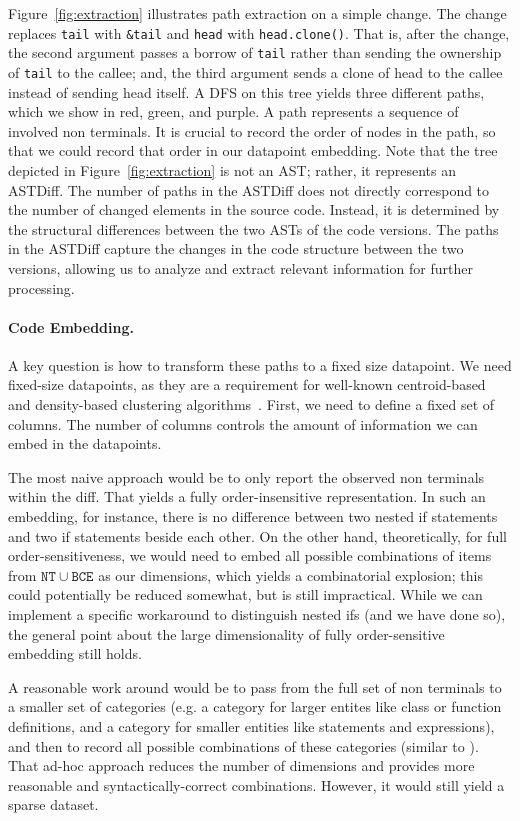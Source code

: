 Figure~\ref{fig:extraction} illustrates path extraction on a simple change. The change replaces \verb+tail+ with \verb+&tail+ and \verb+head+ with \verb+head.clone()+. That is, after the change, the second argument passes a borrow of \verb+tail+ rather than sending the ownership of \verb+tail+ to the callee; and, the third argument sends a clone of head to the callee instead of sending head itself. A DFS on this tree yields three different paths, which we show in red, green, and purple. A path represents a sequence of involved non terminals. It is crucial to record the order of nodes in the path, so that we could record that order in our datapoint embedding. Note that the tree depicted in Figure~\ref{fig:extraction} is not an AST; rather, it represents an ASTDiff. The number of paths in the ASTDiff does not directly correspond to the number of changed elements in the source code. Instead, it is determined by the structural differences between the two ASTs of the code versions. The paths in the ASTDiff capture the changes in the code structure between the two versions, allowing us to analyze and extract relevant information for further processing.


\paragraph{Code Embedding.} A key question is how to transform these paths to a fixed size datapoint. We need fixed-size datapoints, as they are a requirement for well-known centroid-based and density-based clustering algorithms~\citep{xu2005survey}. First, we need to define a fixed set of columns. The number of columns controls the amount of information we can embed in the datapoints. 

The most naive approach would be to only report the observed non terminals within the diff. That yields a fully order-insensitive representation. In such an embedding, for instance, there is no difference between two nested if statements and two if statements beside each other. On the other hand, theoretically, for full order-sensitiveness, we would need to embed all possible combinations of items from $\mathtt{NT} \cup \mathtt{BCE}$ as our dimensions, which yields a combinatorial explosion; this could potentially be reduced somewhat, but is still impractical. While we can implement a specific workaround to distinguish nested ifs (and we have done so), the general point about the large dimensionality of fully order-sensitive embedding still holds.

A reasonable work around would be to pass from the full set of non terminals to a smaller set of categories (e.g. a category for larger entites like class or function definitions, and a category for smaller entities like statements and expressions), and then to record all possible combinations of these categories (similar to \cite{hanam2016discovering}). That ad-hoc approach reduces the number of dimensions and provides more reasonable and syntactically-correct combinations. However, it would still yield a sparse dataset. 

